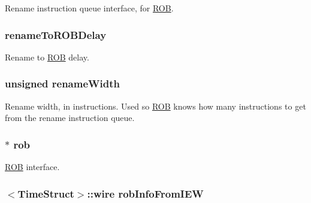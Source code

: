 \label{classDefaultCommit_ae9b536282159ba75153a223be77515ba}
Rename instruction queue interface, for \hyperlink{classROB}{ROB}. \hypertarget{classDefaultCommit_af699b6479037861b3c0e17d4bfab001d}{
\subsubsection[{renameToROBDelay}]{ {\bf renameToROBDelay}}}
\label{classDefaultCommit_af699b6479037861b3c0e17d4bfab001d}
Rename to \hyperlink{classROB}{ROB} delay. \hypertarget{classDefaultCommit_a4b41704382bddb6ee06b5ce97b47dd7b}{
\subsubsection[{renameWidth}]{\setlength{\rightskip}{0pt plus 5cm}unsigned {\bf renameWidth}}}
\label{classDefaultCommit_a4b41704382bddb6ee06b5ce97b47dd7b}
Rename width, in instructions. Used so \hyperlink{classROB}{ROB} knows how many instructions to get from the rename instruction queue. \hypertarget{classDefaultCommit_a74983e0d923870864acf5b5477449d48}{
\subsubsection[{rob}]{$\ast$ {\bf rob}}}
\label{classDefaultCommit_a74983e0d923870864acf5b5477449d48}
\hyperlink{classROB}{ROB} interface. \hypertarget{classDefaultCommit_a2b90705fefdf84763685650c2420f184}{
\subsubsection[{robInfoFromIEW}]{$<${\bf TimeStruct}$>$::wire {\bf robInfoFromIEW}}}
